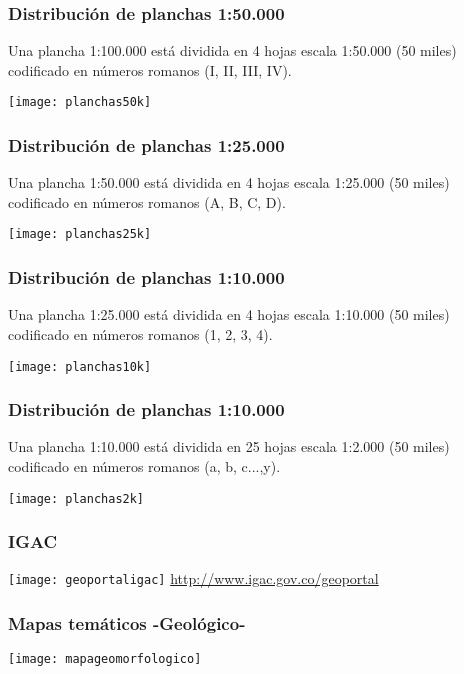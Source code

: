 \documentclass{beamer}
\begin{document}
\begin{frame}
\frametitle{Distribución de planchas 1:50.000}
\small{Una plancha 1:100.000 está dividida en 4 hojas escala 1:50.000 (50 miles) codificado en números romanos (I, II, III, IV).}
\begin{center}
   	\texttt{[image: planchas50k]}
\end{center}
\end{frame}
\begin{frame}
\frametitle{Distribución de planchas 1:25.000}
\small{Una plancha 1:50.000 está dividida en 4 hojas escala 1:25.000 (50 miles) codificado en números romanos (A, B, C, D).}
\begin{center}
   	\texttt{[image: planchas25k]}
\end{center}
\end{frame}
\begin{frame}
\frametitle{Distribución de planchas 1:10.000}
\small{Una plancha 1:25.000 está dividida en 4 hojas escala 1:10.000 (50 miles) codificado en números romanos (1, 2, 3, 4).}
\begin{center}
   	\texttt{[image: planchas10k]}
\end{center}
\end{frame}
\begin{frame}
\frametitle{Distribución de planchas 1:10.000}
\small{Una plancha 1:10.000 está dividida en 25 hojas escala 1:2.000 (50 miles) codificado en números romanos (a, b, c...,y).}
\begin{center}
   	\texttt{[image: planchas2k]}
\end{center}
\end{frame}
\begin{frame}
\frametitle{IGAC}
\begin{center}
   	\texttt{[image: geoportaligac]}
   	\url{http://www.igac.gov.co/geoportal}
\end{center}
\end{frame}
\begin{frame}
\frametitle{Mapas temáticos -Geológico-}
\begin{center}
   	\texttt{[image: mapageomorfologico]}
\end{center}
\end{frame}
\end{document}
